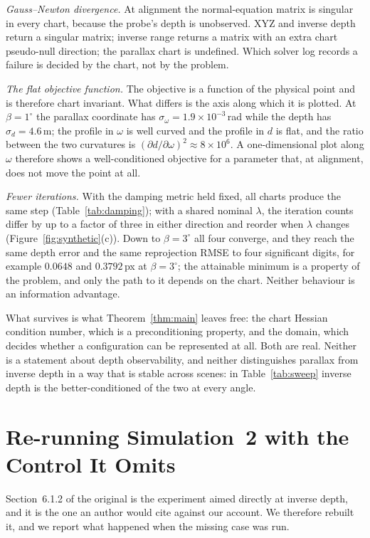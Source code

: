 \documentclass[11pt,a4paper]{article}
\theoremstyle{definition}
\theoremstyle{remark}
\begin{document}
\emph{Gauss--Newton divergence.} At alignment the normal-equation matrix is singular in every chart, because the probe's depth is unobserved. XYZ and inverse depth return a singular matrix; inverse range returns a matrix with an extra chart pseudo-null direction; the parallax chart is undefined. Which solver log records a failure is decided by the chart, not by the problem.

\emph{The flat objective function.} The objective is a function of the physical point and is therefore chart invariant. What differs is the axis along which it is plotted. At $\beta=1^\circ$ the parallax coordinate has $\sigma_\omega=1.9\times10^{-3}$\,rad while the depth has $\sigma_d=4.6$\,m; the profile in $\omega$ is well curved and the profile in $d$ is flat, and the ratio between the two curvatures is $(\partial d/\partial\omega)^{2}\approx8\times10^{6}$. A one-dimensional plot along $\omega$ therefore shows a well-conditioned objective for a parameter that, at alignment, does not move the point at all.

\emph{Fewer iterations.} With the damping metric held fixed, all charts produce the same step (Table~\ref{tab:damping}); with a shared nominal $\lambda$, the iteration counts differ by up to a factor of three in either direction and reorder when $\lambda$ changes (Figure~\ref{fig:synthetic}(c)). Down to $\beta=3^\circ$ all four converge, and they reach the same depth error and the same reprojection RMSE to four significant digits, for example $0.0648$ and $0.3792$\,px at $\beta=3^\circ$; the attainable minimum is a property of the problem, and only the path to it depends on the chart. Neither behaviour is an information advantage.

What survives is what Theorem~\ref{thm:main} leaves free: the chart Hessian condition number, which is a preconditioning property, and the domain, which decides whether a configuration can be represented at all. Both are real. Neither is a statement about depth observability, and neither distinguishes parallax from inverse depth in a way that is stable across scenes: in Table~\ref{tab:sweep} inverse depth is the better-conditioned of the two at every angle.

\section{Re-running Simulation~2 with the Control It Omits}
\label{sec:repro}
Section~6.1.2 of the original is the experiment aimed directly at inverse depth, and it is the one an author would cite against our account. We therefore rebuilt it, and we report what happened when the missing case was run.
\end{document}
